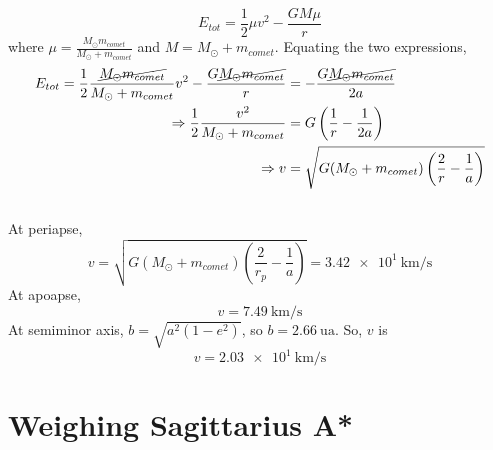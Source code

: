 \documentclass{article}
\begin{document}
\begin{equation}
    E_{tot} = \frac{1}{2} \mu v^2 - \frac{G M \mu}{r}
\end{equation}
where \(\mu = \frac{M_\odot m_{comet}}{M_\odot + m_{comet}}\) and \(M = M_\odot + m_{comet}\).
Equating the two expressions,
\begin{align}
    E_{tot} = \frac{1}{2} \frac{\cancel{M_\odot m_{comet}}}{M_\odot + m_{comet}} v^2 - \frac{G \cancel{M_\odot m_{comet}}}{r} &= -\frac{G \cancel{M_\odot m_{comet}}}{2a} \\
    \Rightarrow \frac{1}{2} \frac{v^2}{M_\odot + m_{comet}} &= G \left(\frac{1}{r} - \frac{1}{2a}\right) \\
    \Rightarrow v &= \sqrt{G (M_\odot + m_{comet}) \left(\frac{2}{r} - \frac{1}{a}\right)}
\end{align}

\subsection{}

At periapse,
\begin{equation}
    v = \sqrt{G (M_\odot + m_{comet}) \left(\frac{2}{r_p} - \frac{1}{a}\right)} = \SI{3.42e+1}{\kilo\meter\per\second}
\end{equation}
At apoapse,
\begin{equation}
    v = \SI{7.49}{\kilo\meter\per\second}
\end{equation}
At semiminor axis, \(b = \sqrt{a^2 (1 - e^2)}\), so \(b = \SI{2.66}{\astronomicalunit}\).
So, \(v\) is
\begin{equation}
    v = \SI{2.03e+1}{\kilo\meter\per\second}
\end{equation}

\section{Weighing Sagittarius A*}

\subsection{}
\end{document}
